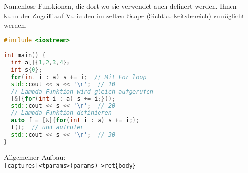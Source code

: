 \documentclass[10pt,twocolumn]{scrartcl}
\begin{document}
Namenlose Funtkionen, die dort wo sie verwendet auch definert werden. Ihnen kann
der Zugriff auf Variablen im selben Scope (Sichtbarkeitsbereich) ermöglicht
werden.

\begin{lstlisting}[language=C++]
#include <iostream>

int main() {
  int a[]{1,2,3,4};
  int s{0};
  for(int i : a) s += i;  // Mit For loop
  std::cout << s << '\n';  // 10
  // Lambda Funktion wird gleich aufgerufen
  [&]{for(int i : a) s += i;}();
  std::cout << s << '\n';  // 20
  // Lambda Funktion definieren
  auto f = [&]{for(int i : a) s += i;};
  f();  // und aufrufen
  std::cout << s << '\n';  // 30
}
\end{lstlisting}

Allgemeiner Aufbau:\\
\lstinline|[captures]<tparams>(params)->ret{body}|\\







\end{document}
